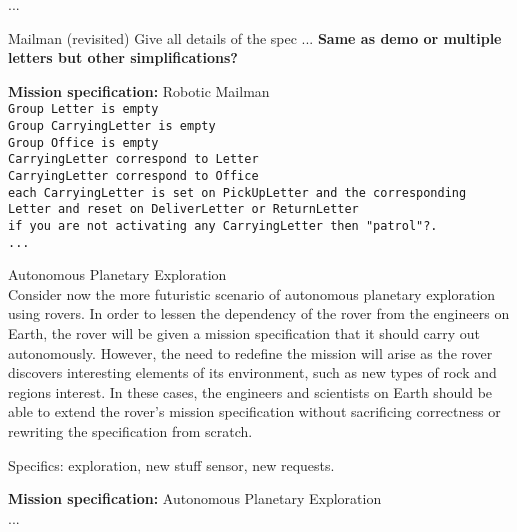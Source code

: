 ...

\begin{myExample}\label{Ex:mailman3} Mailman (revisited)
	Give all details of the spec ... \textbf{Same as demo or multiple letters but other simplifications?}
\end{myExample}

\begin{algorithm}
	\textbf{Mission specification:} Robotic Mailman\\
	{\small
	\texttt{Group Letter is empty}\\
	\texttt{Group CarryingLetter is empty}\\
	\texttt{Group Office is empty}\\
	\texttt{CarryingLetter correspond to Letter}\\
	\texttt{CarryingLetter correspond to Office}\\
	\texttt{each CarryingLetter is set on PickUpLetter and the corresponding Letter and reset on 			DeliverLetter or ReturnLetter}\\
	
	\texttt{if you are not activating any CarryingLetter then "patrol"?.}\\
	\texttt{...}
	}
\end{algorithm}

\begin{myExample}\label{Ex:planetxplore} Autonomous Planetary Exploration\\
	Consider now the more futuristic scenario of autonomous planetary exploration using rovers. In order to lessen the dependency of the rover from the engineers on Earth, the rover will be given a mission specification that it should carry out autonomously. However, the need to redefine the mission will arise as the rover discovers interesting elements of its environment, such as new types of rock and regions interest. In these cases, the engineers and scientists on Earth should be able to extend the rover's mission specification without sacrificing correctness or rewriting the specification from scratch.
	
	Specifics: exploration, new stuff sensor, new requests.
\end{myExample}

\begin{algorithm}
	\textbf{Mission specification:} Autonomous Planetary Exploration\\
	...
\end{algorithm}